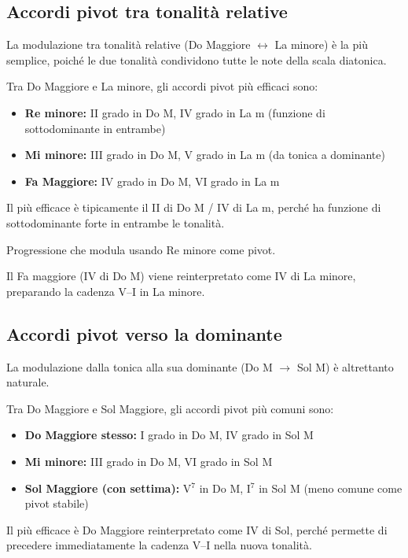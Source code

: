 \subsection{Accordi pivot tra tonalità relative}
\label{subsec:pivot_relative}

La modulazione tra tonalità relative (Do Maggiore $\leftrightarrow$ La minore) è la più semplice, poiché le due tonalità condividono tutte le note della scala diatonica.

\begin{regola}
	\label{reg:pivot_relative}
	Tra Do Maggiore e La minore, gli accordi pivot più efficaci sono:
	
	\begin{itemize}
		\item \textbf{Re minore:} II grado in Do M, IV grado in La m (funzione di sottodominante in entrambe)
		\item \textbf{Mi minore:} III grado in Do M, V grado in La m (da tonica a dominante)
		\item \textbf{Fa Maggiore:} IV grado in Do M, VI grado in La m
	\end{itemize}
	
	Il più efficace è tipicamente il II di Do M / IV di La m, perché ha funzione di sottodominante forte in entrambe le tonalità.
\end{regola}

\begin{esempio}
	\label{ex:mod_do_lam}
	Progressione che modula usando Re minore come pivot.

	Il Fa maggiore (IV di Do M) viene reinterpretato come IV di La minore, preparando la cadenza V--I in La minore.
\end{esempio}

\subsection{Accordi pivot verso la dominante}
\label{subsec:pivot_dominante}

La modulazione dalla tonica alla sua dominante (Do M $\rightarrow$ Sol M) è altrettanto naturale.

\begin{regola}
	\label{reg:pivot_dominante}
	Tra Do Maggiore e Sol Maggiore, gli accordi pivot più comuni sono:
	
	\begin{itemize}
		\item \textbf{Do Maggiore stesso:} I grado in Do M, IV grado in Sol M
		\item \textbf{Mi minore:} III grado in Do M, VI grado in Sol M
		\item \textbf{Sol Maggiore (con settima):} V$^7$ in Do M, I$^7$ in Sol M (meno comune come pivot stabile)
	\end{itemize}
	
	Il più efficace è Do Maggiore reinterpretato come IV di Sol, perché permette di precedere immediatamente la cadenza V--I nella nuova tonalità.
\end{regola}

